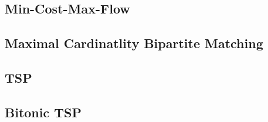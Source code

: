 \subsection{Min-Cost-Max-Flow}


\subsection{Maximal Cardinatlity Bipartite Matching}\label{kuhn}


\subsection{TSP}


\subsection{Bitonic TSP}


